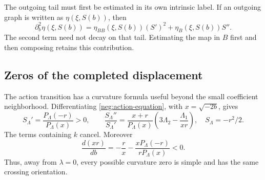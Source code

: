 The outgoing tail must first be estimated in its own intrinsic label. If
an outgoing graph is written as \(\eta(\xi,S(b))\), then
\[
 \partial_b^2\eta(\xi,S(b))
    =\eta_{BB}(\xi,S(b))(S')^2+\eta_B(\xi,S(b))S'' .
\]
The second term need not decay on that tail. Estimating the map in
\(B\) first and then composing retains this contribution.

\subsection{Zeros of the completed displacement}

The action transition has a curvature formula useful beyond the
small coefficient neighborhood. Differentiating
\eqref{neg:action-equation}, with \(x=\sqrt{-2b}\), gives
\begin{equation}\label{neg:action-curvature}
 S_\Lambda'=
     \frac{P_\Lambda(-r)}{P_\Lambda(x)}>0,
 \qquad
 \frac{S_\Lambda''}{S_\Lambda'}
   =\frac{x+r}{P_\Lambda(x)}
                 \left(3\Lambda_2-\frac{\Lambda_1}{xr}\right),
 \quad S_\Lambda=-r^2/2 .
\end{equation}
The terms containing \(k\) cancel. Moreover
\begin{equation}\label{neg:entry-exit-monotonicity}
 \frac{d(xr)}{db}
      =-\frac r x-\frac{xP_\Lambda(-r)}{rP_\Lambda(x)}<0 .
\end{equation}
Thus, away from \(\lambda=0\), every possible curvature zero is
simple and has the same crossing orientation.

